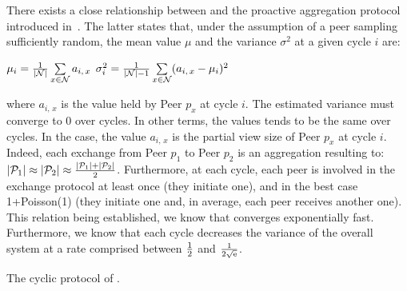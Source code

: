 There exists a close relationship between \SCAMPLON{} and the proactive
aggregation protocol introduced
in~\cite{jelasity2004epidemic,montresor2004robust}. The latter states that,
under the assumption of a peer sampling sufficiently random, the mean value
$\mu$ and the variance $\sigma^2$ at a given cycle $i$ are:
\begin{center}
  $\mu_i = {1\over{|\mathcal{N}|}} \sum\limits_{x \in \mathcal{N}} a_{i,\,x}$
  \hfill
  $\sigma^2_i = {1\over{|\mathcal{N}|-1}}\sum\limits_{x \in \mathcal{N}}
  (a_{i,\,x} - \mu_i)^2$
\end{center}
where $a_{i,\,x}$ is the value held by Peer $p_x$ at cycle $i$. The estimated
variance must converge to $0$ over cycles. In other terms, the values tends to
be the same over cycles. In the \SCAMPLON{} case, the value $a_{i,\,x}$ is the
partial view size of Peer $p_x$ at cycle $i$. Indeed, each exchange from Peer
$p_1$ to Peer $p_2$ is an aggregation resulting to:
$|\mathcal{P}_1|\approx|\mathcal{P}_2|\approx{|\mathcal{P}_1| + |\mathcal{P}_2|
  \over{2}}$.
Furthermore, at each cycle, each peer is involved in the exchange protocol at
least once (they initiate one), and in the best case 1+Poisson(1) (they
initiate one and, in average, each peer receives another one). This relation
being established, we know that \SCAMPLON{} converges exponentially
fast. Furthermore, we know that each cycle decreases the variance of the
overall system at a rate comprised between ${1\over{2}}$ and
$1\over{2\sqrt{\text{e}}}$.

\begin{algorithm}
  
  \caption{\label{algo:scamplon}The cyclic protocol of \SCAMPLON{}.}
\end{algorithm}

